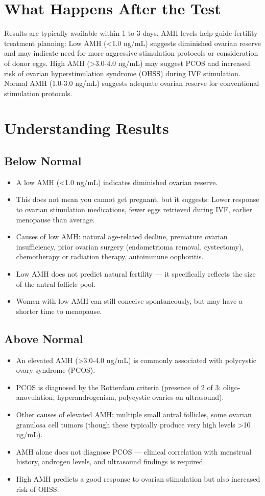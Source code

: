 \section*{What Happens After the Test}
Results are typically available within 1 to 3 days. AMH levels help guide fertility treatment planning: Low AMH (<1.0 ng/mL) suggests diminished ovarian reserve and may indicate need for more aggressive stimulation protocols or consideration of donor eggs. High AMH (>3.0-4.0 ng/mL) may suggest PCOS and increased risk of ovarian hyperstimulation syndrome (OHSS) during IVF stimulation. Normal AMH (1.0-3.0 ng/mL) suggests adequate ovarian reserve for conventional stimulation protocols.

\section*{Understanding Results}

\subsection*{Below Normal}
\begin{itemize}
  \item A low AMH (<1.0 ng/mL) indicates diminished ovarian reserve.
  \item This does not mean you cannot get pregnant, but it suggests: Lower response to ovarian stimulation medications, fewer eggs retrieved during IVF, earlier menopause than average.
  \item Causes of low AMH: natural age-related decline, premature ovarian insufficiency, prior ovarian surgery (endometrioma removal, cystectomy), chemotherapy or radiation therapy, autoimmune oophoritis.
  \item Low AMH does not predict natural fertility --- it specifically reflects the size of the antral follicle pool.
  \item Women with low AMH can still conceive spontaneously, but may have a shorter time to menopause.
\end{itemize}

\subsection*{Above Normal}
\begin{itemize}
  \item An elevated AMH (>3.0-4.0 ng/mL) is commonly associated with polycystic ovary syndrome (PCOS).
  \item PCOS is diagnosed by the Rotterdam criteria (presence of 2 of 3: oligo-anovulation, hyperandrogenism, polycystic ovaries on ultrasound).
  \item Other causes of elevated AMH: multiple small antral follicles, some ovarian granulosa cell tumors (though these typically produce very high levels >10 ng/mL).
  \item AMH alone does not diagnose PCOS --- clinical correlation with menstrual history, androgen levels, and ultrasound findings is required.
  \item High AMH predicts a good response to ovarian stimulation but also increased risk of OHSS.
\end{itemize}

